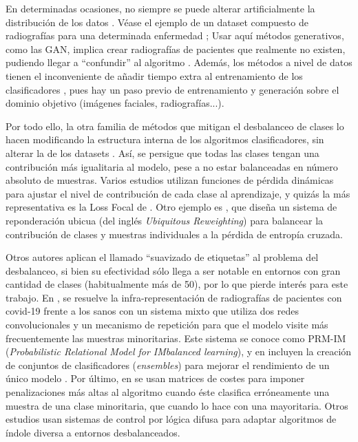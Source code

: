 En determinadas ocasiones, no siempre se puede alterar artificialmente la distribución de los datos \cite{yan2019joint}. Véase el ejemplo de un dataset compuesto de radiografías para una determinada enfermedad \cite{rahimzadeh2020modified}; Usar aquí métodos generativos, como las GAN, implica crear radiografías de pacientes que realmente no existen, pudiendo llegar a ``confundir'' al algoritmo \cite{rahimzadeh2020modified}. Además, los métodos a nivel de datos tienen el inconveniente de añadir tiempo extra al entrenamiento de los clasificadores \cite{han2020toward,johnson2019survey}, pues hay un paso previo de entrenamiento y generación sobre el dominio objetivo (imágenes faciales, radiografías...).

Por todo ello, la otra familia de métodos que mitigan el desbalanceo de clases lo hacen modificando la estructura interna de los algoritmos clasificadores, sin alterar la de los datasets \cite{zhao2021lightweight,zhong2021improving,han2020toward}. Así, se persigue que todas las clases tengan una contribución más igualitaria al modelo, pese a no estar balanceadas en número absoluto de muestras. Varios estudios \cite{liu2017fuzzy,cho2020instance,patel2017classification,vluymans2019dealing,hong2021fuzzy,fernandez2010solving,tuncc2020fuzzy,lin2017focal} utilizan funciones de pérdida dinámicas para ajustar el nivel de contribución de cada clase al aprendizaje, y quizás la más representativa es la Loss Focal de \citet{lin2017focal}. Otro ejemplo es \citet{li2019learning}, que diseña un sistema de reponderación ubicua (del inglés \textit{Ubiquitous Reweighting}) para balancear la contribución de clases y muestras individuales a la pérdida de entropía cruzada.

Otros autores aplican el llamado ``suavizado de etiquetas'' \cite{zhong2021improving,Szegedy_2016_CVPR} al problema del desbalanceo, si bien su efectividad sólo llega a ser notable en entornos con gran cantidad de clases (habitualmente más de 50), por lo que pierde interés para este trabajo. En \citet{liu2022solving}, se resuelve la infra-representación de radiografías de pacientes con covid-19 frente a los sanos con un sistema mixto que utiliza dos redes convolucionales y un mecanismo de repetición para que el modelo visite más frecuentemente las muestras minoritarias. Este sistema se conoce como PRM-IM (\textit{Probabilistic Relational Model for IMbalanced learning}), y en \citet{guo2004learning} incluyen la creación de conjuntos de clasificadores (\textit{ensembles}) para mejorar el rendimiento de un único modelo .
Por último, en \citet{khan2017cost} se usan matrices de costes para imponer penalizaciones más altas al algoritmo cuando éste clasifica erróneamente una muestra de una clase minoritaria, que cuando lo hace con una mayoritaria. Otros estudios \cite{patel2017classification,cho2020instance,liu2017fuzzy} usan sistemas de control por lógica difusa para adaptar algoritmos de índole diversa a entornos desbalanceados.